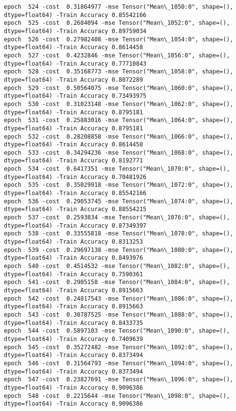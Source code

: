 \documentclass[11pt]{article}
\begin{document}
\begin{Verbatim}[commandchars=\\\{\}]
epoch  524 -cost  0.31864977 -mse Tensor("Mean\_1050:0", shape=(), dtype=float64) -Train Accuracy 0.85542166
epoch  525 -cost  0.2684094 -mse Tensor("Mean\_1052:0", shape=(), dtype=float64) -Train Accuracy 0.89759034
epoch  526 -cost  0.27982408 -mse Tensor("Mean\_1054:0", shape=(), dtype=float64) -Train Accuracy 0.8614458
epoch  527 -cost  0.4232846 -mse Tensor("Mean\_1056:0", shape=(), dtype=float64) -Train Accuracy 0.77710843
epoch  528 -cost  0.35168773 -mse Tensor("Mean\_1058:0", shape=(), dtype=float64) -Train Accuracy 0.8072289
epoch  529 -cost  0.50564075 -mse Tensor("Mean\_1060:0", shape=(), dtype=float64) -Train Accuracy 0.73493975
epoch  530 -cost  0.31023148 -mse Tensor("Mean\_1062:0", shape=(), dtype=float64) -Train Accuracy 0.8795181
epoch  531 -cost  0.25883016 -mse Tensor("Mean\_1064:0", shape=(), dtype=float64) -Train Accuracy 0.8795181
epoch  532 -cost  0.28208858 -mse Tensor("Mean\_1066:0", shape=(), dtype=float64) -Train Accuracy 0.8614458
epoch  533 -cost  0.34294236 -mse Tensor("Mean\_1068:0", shape=(), dtype=float64) -Train Accuracy 0.8192771
epoch  534 -cost  0.6417351 -mse Tensor("Mean\_1070:0", shape=(), dtype=float64) -Train Accuracy 0.70481926
epoch  535 -cost  0.35029918 -mse Tensor("Mean\_1072:0", shape=(), dtype=float64) -Train Accuracy 0.85542166
epoch  536 -cost  0.29053745 -mse Tensor("Mean\_1074:0", shape=(), dtype=float64) -Train Accuracy 0.88554215
epoch  537 -cost  0.2593834 -mse Tensor("Mean\_1076:0", shape=(), dtype=float64) -Train Accuracy 0.87349397
epoch  538 -cost  0.33555818 -mse Tensor("Mean\_1078:0", shape=(), dtype=float64) -Train Accuracy 0.8313253
epoch  539 -cost  0.29697138 -mse Tensor("Mean\_1080:0", shape=(), dtype=float64) -Train Accuracy 0.8493976
epoch  540 -cost  0.4514532 -mse Tensor("Mean\_1082:0", shape=(), dtype=float64) -Train Accuracy 0.7590361
epoch  541 -cost  0.2905158 -mse Tensor("Mean\_1084:0", shape=(), dtype=float64) -Train Accuracy 0.8915663
epoch  542 -cost  0.24817543 -mse Tensor("Mean\_1086:0", shape=(), dtype=float64) -Train Accuracy 0.8915663
epoch  543 -cost  0.30787525 -mse Tensor("Mean\_1088:0", shape=(), dtype=float64) -Train Accuracy 0.8433735
epoch  544 -cost  0.5897103 -mse Tensor("Mean\_1090:0", shape=(), dtype=float64) -Train Accuracy 0.7409639
epoch  545 -cost  0.35272482 -mse Tensor("Mean\_1092:0", shape=(), dtype=float64) -Train Accuracy 0.8373494
epoch  546 -cost  0.31564793 -mse Tensor("Mean\_1094:0", shape=(), dtype=float64) -Train Accuracy 0.8373494
epoch  547 -cost  0.23827691 -mse Tensor("Mean\_1096:0", shape=(), dtype=float64) -Train Accuracy 0.9096386
epoch  548 -cost  0.2215644 -mse Tensor("Mean\_1098:0", shape=(), dtype=float64) -Train Accuracy 0.9096386

\end{Verbatim}
\end{document}

